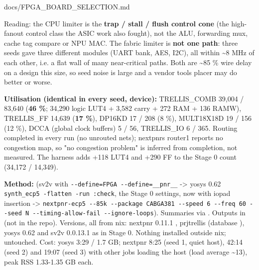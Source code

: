 \begin{relocated}{docs/FPGA_BOARD_SELECTION.md}
{}

Reading: the CPU limiter is the \textbf{trap / stall / flush control
cone} (the high-fanout control class the ASIC work also fought), not the
ALU, forwarding mux, cache tag compare or NPU MAC. The fabric limiter is
\textbf{not one path}: three seeds gave three different modules (UART
bank, AES, I2C), all within \textasciitilde8 MHz of each other, i.e. a
flat wall of many near-critical paths. Both are \textasciitilde85 \%
wire delay on a design this size, so seed noise is large and a vendor
tool\textquotesingle s placer may do better or worse.

\textbf{Utilisation (identical in every seed,  device):}
TRELLIS\_\allowbreak{}COMB 39,004 / 83,640 (\textbf{46 \%}; 34,290 logic
LUT4 + 3,582 carry + 272 RAM + 136 RAMW), TRELLIS\_\allowbreak{}FF
14,639 (\textbf{17 \%}), DP16KD 17 / 208 (8 \%), MULT18X18D 19 / 156 (12
\%), DCCA (global clock buffers) 5 / 56, TRELLIS\_\allowbreak{}IO 6 /
365. Routing completed in every run (no unrouted nets);
nextpnr\textquotesingle s router1 reports no congestion map, so "no
congestion problem" is inferred from completion, not measured. The
harness adds +118 LUT4 and +290 FF to the Stage 0 count (34,172 /
14,349).

\textbf{Method:}  (sv2v with
\texttt{-\allowbreak{}-\allowbreak{}define=\allowbreak{}FPGA\ -\allowbreak{}-\allowbreak{}define=\allowbreak{}\_\allowbreak{}\_\allowbreak{}pnr\_\allowbreak{}\_\allowbreak{}}
-\textgreater{} yosys 0.62
\texttt{synth\_\allowbreak{}ecp5\ -\allowbreak{}flatten\ -\allowbreak{}run\ :\allowbreak{}check},
the Stage 0 settings, now with iopad insertion -\textgreater{}
\texttt{nextpnr-\allowbreak{}ecp5\ -\allowbreak{}-\allowbreak{}85k\ -\allowbreak{}-\allowbreak{}package\ CABGA381\ -\allowbreak{}-\allowbreak{}speed\ 6\ -\allowbreak{}-\allowbreak{}freq\ 60\ -\allowbreak{}-\allowbreak{}seed\ N\ -\allowbreak{}-\allowbreak{}timing-\allowbreak{}allow-\allowbreak{}fail\ -\allowbreak{}-\allowbreak{}ignore-\allowbreak{}loops}).
Summaries via . Outputs in
 (not in the repo). Versions, all from
nix: nextpnr 0.11.1
,
prjtrellis 
(database ), yosys 0.62 and sv2v
0.0.13.1 as in Stage 0. Nothing installed outside nix; 
untouched. Cost: yosys 3:29 / 1.7 GB; nextpnr 8:25 (seed 1, quiet host),
42:14 (seed 2) and 19:07 (seed 3) with other jobs loading the host (load
average \textasciitilde13), peak RSS 1.33-1.35 GB each.


\end{relocated}
